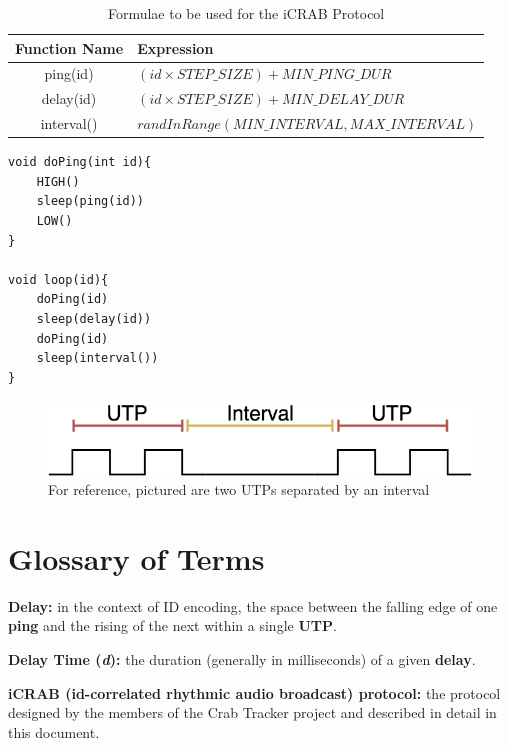 \documentclass[12pt]{article}
\begin{document}
\begin{table}[ht]
\centering
\begin{tabular}{|c|l|}
\hline
Function Name & Expression \\
\hline
ping(id)		&	$(id \times STEP\_SIZE)+MIN\_PING\_DUR$	\\
delay(id)	&	$(id \times STEP\_SIZE)+MIN\_DELAY\_DUR$	\\
interval()	&	$randInRange(MIN\_INTERVAL, MAX\_INTERVAL)$	\\
\hline
\end{tabular}
\caption{Formulae to be used for the iCRAB Protocol}\label{table:formulae}
\end{table}


\begin{lstlisting}[caption={Transmitter Behavior},label={lst:tx}]
void doPing(int id){
	HIGH()
	sleep(ping(id))
	LOW()
}

void loop(id){
	doPing(id)
	sleep(delay(id))
	doPing(id)
	sleep(interval())
}
\end{lstlisting}

\begin{figure}[h]
\centering
\includegraphics[scale=0.5]{interval}

\caption{For reference, pictured are two UTPs separated by an interval}
\label{fig:interval}
\end{figure}


\newpage
\appendix
\section{Glossary of Terms} \label{glossary}

{\bf Delay:}
	in the context of ID encoding, the space between the falling edge of one
	{\bf ping} and the rising of the next within a single {\bf UTP}.

{\bf Delay Time ({\em d}):}
	the duration (generally in milliseconds) of a given {\bf delay}.

{\bf iCRAB (id-correlated rhythmic audio broadcast) protocol:}
	the protocol designed by the members of the Crab Tracker project and
	described in detail in this document.
\end{document}
